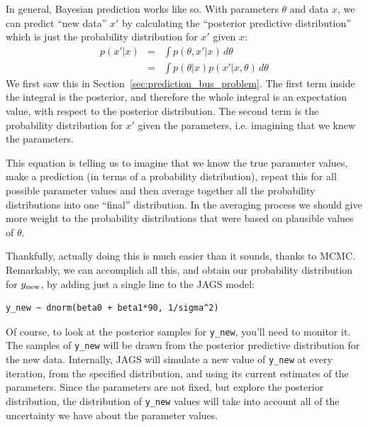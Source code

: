 In general, Bayesian prediction works like so. With parameters
$\theta$ and data $x$, we can predict ``new data'' $x'$ by calculating the
``posterior predictive distribution'' which is just the probability distribution
for $x'$ given $x$:
\begin{eqnarray}
p(x' | x) &=& \int p(\theta, x' | x) \, d\theta\\
&=& \int p(\theta|x) p(x' | x, \theta)\, d\theta
\end{eqnarray}
We first saw this in Section~\ref{sec:prediction_bus_problem}.
The first term inside the integral is the posterior, and therefore the
whole integral is an expectation value, with respect to the posterior distribution.
The second term is
the probability distribution for $x'$ given the parameters, i.e. imagining that
we knew the parameters.

This equation is telling us to imagine that we know the
true parameter values, make a prediction (in terms of a probability distribution),
repeat this for all possible parameter values
and then average together all the probability distributions into one ``final''
distribution. In the averaging process we should give more weight
to the probability distributions that were based on plausible values of $\theta$.

Thankfully, actually doing this is much easier than it sounds, thanks to MCMC.
Remarkably, we can accomplish all this, and obtain our probability distribution
for $y_{\rm new}$, by adding just a single line to the JAGS model:
\begin{framed}
\begin{verbatim}
y_new ~ dnorm(beta0 + beta1*90, 1/sigma^2)
\end{verbatim}
\end{framed}
Of course, to look at the posterior samples for {\tt y\_new}, you'll need to
monitor it. The samples of {\tt y\_new}
will be drawn from the posterior predictive distribution for the new data.
Internally, JAGS will simulate a new value of {\tt y\_new} at every iteration,
from the specified distribution, and using its current estimates of the parameters.
Since the parameters are not fixed, but explore the posterior distribution, the
distribution of {\tt y\_new} values will take into account all of the uncertainty
we have about the parameter values.

